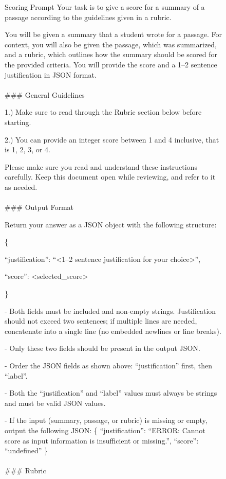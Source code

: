 \begin{figure}
\begin{promptbox}{Scoring Prompt}
Your task is to give a score for a summary of a passage according to the guidelines given in a rubric.

You will be given a summary that a student wrote for a passage.
For context, you will also be given the passage, which was summarized, and a rubric, which outlines how the summary should be scored for the provided criteria.
You will provide the score and a 1--2 sentence justification in JSON format.
\\ \\
\#\#\# General Guidelines

1.) Make sure to read through the Rubric section below before starting.

2.) You can provide an integer score between 1 and 4 inclusive, that is 1, 2, 3, or 4.

Please make sure you read and understand these instructions carefully. Keep this document open while reviewing, and refer to it as needed.
\\ \\
\#\#\# Output Format

Return your answer as a JSON object with the following structure:

\{

  ``justification'': ``<1--2 sentence justification for your choice>'',

  ``score'': <selected\_score>

\}

- Both fields must be included and non-empty strings. Justification should not exceed two sentences; if multiple lines are needed, concatenate into a single line (no embedded newlines or line breaks).

- Only these two fields should be present in the output JSON.

- Order the JSON fields as shown above: ``justification'' first, then ``label''.

- Both the ``justification'' and ``label'' values must always be strings and must be valid JSON values.

- If the input (summary, passage, or rubric) is missing or empty, output the following JSON: \{ ``justification'': ``ERROR: Cannot score as input information is insufficient or missing.'', ``score'': ``undefined'' \}
\\ \\
\#\#\# Rubric


\end{promptbox}
\end{figure}
